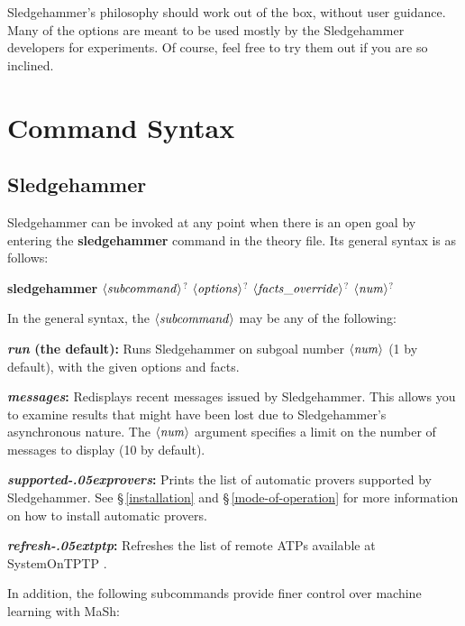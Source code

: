 \documentclass[a4paper,12pt]{article}
\let\oldS=\S
\def\S{\oldS\,}
\def\qty#1{\ensuremath{\left<\mathit{#1\/}\right>}}
\renewcommand\_{\hbox{\textunderscore\kern-.05ex}}
\begin{document}

Sledgehammer's philosophy should work out of the box, without user guidance.
Many of the options are meant to be used mostly by the Sledgehammer developers
for experiments. Of course, feel free to try them out if you are so inclined.

\section{Command Syntax}
\label{command-syntax}

\subsection{Sledgehammer}
\label{sledgehammer}

Sledgehammer can be invoked at any point when there is an open goal by entering
the \textbf{sledgehammer} command in the theory file. Its general syntax is as
follows:

\prew
\textbf{sledgehammer} \qty{subcommand}$^?$ \qty{options}$^?$ \qty{facts\_override}$^?$ \qty{num}$^?$
\postw

In the general syntax, the \qty{subcommand} may be any of the following:

\begin{enum}
\item[\labelitemi] \textbf{\textit{run} (the default):} Runs Sledgehammer on
subgoal number \qty{num} (1 by default), with the given options and facts.

\item[\labelitemi] \textbf{\textit{messages}:} Redisplays recent messages issued
by Sledgehammer. This allows you to examine results that might have been lost
due to Sledgehammer's asynchronous nature. The \qty{num} argument specifies a
limit on the number of messages to display (10 by default).

\item[\labelitemi] \textbf{\textit{supported\_provers}:} Prints the list of
automatic provers supported by Sledgehammer. See \S\ref{installation} and
\S\ref{mode-of-operation} for more information on how to install automatic
provers.

\item[\labelitemi] \textbf{\textit{refresh\_tptp}:} Refreshes the list of remote
ATPs available at System\-On\-TPTP \cite{sutcliffe-2000}.
\end{enum}

In addition, the following subcommands provide finer control over machine
learning with MaSh:
\end{document}
